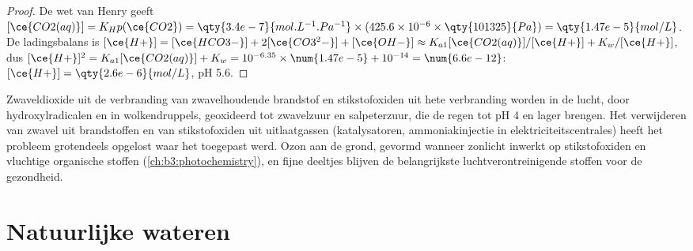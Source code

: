 \begin{proof}
De wet van Henry geeft $[\ce{CO2(aq)}] = K_Hp(\ce{CO2}) = \qty{3.4e-7}{mol.L^{-1}.Pa^{-1}} \times (425.6 \times 10^{-6} \times \qty{101325}{Pa}) = \qty{1.47e-5}{mol/L}$. De
ladingsbalans is $[\ce{H+}] = [\ce{HCO3-}] + 2[\ce{CO3^2-}] + [\ce{OH-}] \approx K_{a1}[\ce{CO2(aq)}]/[\ce{H+}] + K_w/[\ce{H+}]$, dus
$[\ce{H+}]^2 = K_{a1}[\ce{CO2(aq)}] + K_w = 10^{-6.35} \times \num{1.47e-5} + 10^{-14} = \num{6.6e-12}$: $[\ce{H+}] = \qty{2.6e-6}{mol/L}$, pH 5.6.
\end{proof}

Zwaveldioxide uit de verbranding van zwavelhoudende brandstof en
stikstofoxiden uit hete verbranding worden in de lucht, door
hydroxylradicalen en in wolkendruppels, geoxideerd tot zwavelzuur en
salpeterzuur, die de regen tot pH 4 en lager brengen. Het verwijderen van
zwavel uit brandstoffen en van stikstofoxiden uit uitlaatgassen
(katalysatoren, ammoniakinjectie in elektriciteitscentrales) heeft het
probleem grotendeels opgelost waar het toegepast werd. Ozon aan de grond,
gevormd wanneer zonlicht inwerkt op stikstofoxiden en vluchtige
organische stoffen (\cref{ch:b3:photochemistry}), en fijne deeltjes
blijven de belangrijkste luchtverontreinigende stoffen voor de
gezondheid.

\section{Natuurlijke wateren}

